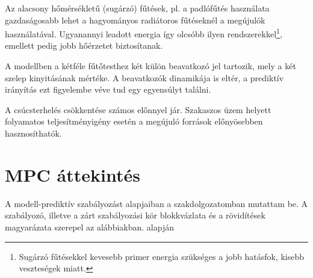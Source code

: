 Az alacsony hőmérsékletű (sugárzó) fűtések, pl. a padlófűtés használata gazdaságosabb lehet a hagyományos radiátoros fűtéseknél a megújulók használatával. Ugyanannyi leadott energia így olcsóbb ilyen rendszerekkel\footnote{Sugárzó fűtésekkel kevesebb primer energia szükséges a jobb hatásfok, kisebb veszteségek miatt.}, emellett pedig jobb hőérzetet biztosítanak.

A modellben a kétféle fűtőtesthez két külön beavatkozó jel tartozik, mely a két szelep kinyitásának mértéke. A beavatkozók dinamikája is eltér, a prediktív irányítás ezt figyelembe véve tud egy egyensúlyt találni.

A csúcsterhelés csökkentése számos előnnyel jár. Szakaszos üzem helyett folyamatos teljesítményigény esetén a megújuló források előnyösebben hasznosíthatók. 

\section{MPC áttekintés}

A modell-prediktív szabályozást alapjaiban a szakdolgozatomban mutattam be. A szabályozó, illetve a zárt szabályozási kör blokkvázlata és a rövidítések magyarázata szerepel az alábbiakban.
\cite{MPCtoolboxGuide} alapján



\vspace{6pt}

